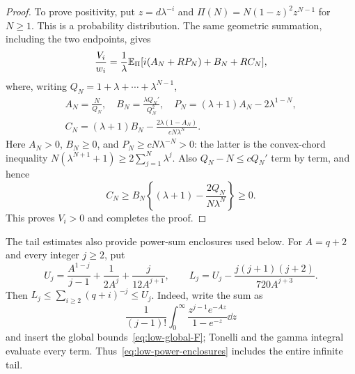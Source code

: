 \begin{proof}
To prove positivity, put $z=d\lambda^{-i}$ and
$\Pi(N)=N(1-z)^2z^{N-1}$ for $N\ge1$.  This is a probability
distribution.  The same geometric summation, including the two
endpoints, gives
\begin{equation}\label{eq:low-positive-mixture}
 \frac{V_i}{w_i}=\frac1\lambda\mathbb E_\Pi
       [i(A_N+RP_N)+B_N+RC_N],
\end{equation}
where, writing $Q_N=1+\lambda+\cdots+\lambda^{N-1}$,
\[\begin{gathered}
 A_N=\frac{N}{Q_N},\quad B_N=\frac{\lambda Q_N'}{Q_N^2},\quad
 P_N=(\lambda+1)A_N-2\lambda^{1-N},\\
 C_N=(\lambda+1)B_N-
          \frac{2\lambda(1-A_N)}{cN\lambda^N}.
\end{gathered}\]
Here $A_N>0$, $B_N\ge0$, and
$P_N\ge cN\lambda^{-N}>0$: the latter is the convex-chord
inequality $N(\lambda^{N+1}+1)\ge2\sum_{j=1}^N\lambda^j$.
Also $Q_N-N\le cQ_N'$ term by term, and hence
\[
 C_N\ge B_N\left\{(\lambda+1)-\frac{2Q_N}{N\lambda^N}\right\}\ge0.
\]
This proves $V_i>0$ and completes the proof.
\end{proof}

The tail estimates also provide power-sum enclosures used below.  For
$A=q+2$ and every integer $j\ge2$, put
\begin{equation}\label{eq:low-power-enclosures}
 U_j=\frac{A^{1-j}}{j-1}+\frac1{2A^j}+\frac{j}{12A^{j+1}},\qquad
 L_j=U_j-\frac{j(j+1)(j+2)}{720A^{j+3}}.
\end{equation}
Then $L_j\le\sum_{i\ge2}(q+i)^{-j}\le U_j$.
Indeed, write the sum as
\[
 \frac1{(j-1)!}\int_0^\infty
       \frac{z^{j-1}e^{-Az}}{1-e^{-z}}\dd z
\]
and insert the global bounds~\eqref{eq:low-global-F}; Tonelli and
the gamma integral evaluate every term.  Thus~\eqref{eq:low-power-enclosures}
includes the entire infinite tail.

